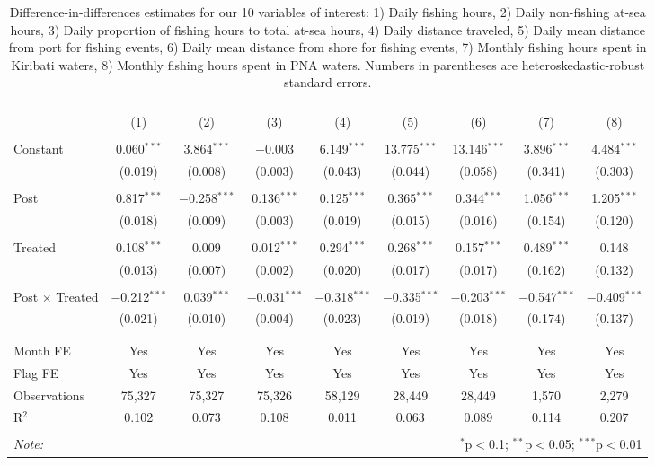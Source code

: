 
\begin{table}[!htbp] \centering 
  \caption{\label{tab:DID_without_CHN}Difference-in-differences estimates for our 10 variables of interest: 1) Daily fishing hours, 2) Daily non-fishing at-sea hours, 3) Daily proportion of fishing hours to total at-sea hours, 4) Daily distance traveled, 5) Daily mean distance from port for fishing events, 6) Daily mean distance from shore for fishing events, 7) Monthly fishing hours spent in Kiribati waters, 8) Monthly fishing hours spent in PNA waters. Numbers in parentheses are heteroskedastic-robust standard errors.} 
  \label{} 
\footnotesize 
\begin{tabular}{@{\extracolsep{1pt}}lcccccccc} 
\\[-1.8ex]\hline 
\hline \\[-1.8ex] 
\\[-1.8ex] & (1) & (2) & (3) & (4) & (5) & (6) & (7) & (8)\\ 
\hline \\[-1.8ex] 
 Constant & 0.060$^{***}$ & 3.864$^{***}$ & $-$0.003 & 6.149$^{***}$ & 13.775$^{***}$ & 13.146$^{***}$ & 3.896$^{***}$ & 4.484$^{***}$ \\ 
  & (0.019) & (0.008) & (0.003) & (0.043) & (0.044) & (0.058) & (0.341) & (0.303) \\ 
  & & & & & & & & \\ 
 Post & 0.817$^{***}$ & $-$0.258$^{***}$ & 0.136$^{***}$ & 0.125$^{***}$ & 0.365$^{***}$ & 0.344$^{***}$ & 1.056$^{***}$ & 1.205$^{***}$ \\ 
  & (0.018) & (0.009) & (0.003) & (0.019) & (0.015) & (0.016) & (0.154) & (0.120) \\ 
  & & & & & & & & \\ 
 Treated & 0.108$^{***}$ & 0.009 & 0.012$^{***}$ & 0.294$^{***}$ & 0.268$^{***}$ & 0.157$^{***}$ & 0.489$^{***}$ & 0.148 \\ 
  & (0.013) & (0.007) & (0.002) & (0.020) & (0.017) & (0.017) & (0.162) & (0.132) \\ 
  & & & & & & & & \\ 
 Post $\times$ Treated & $-$0.212$^{***}$ & 0.039$^{***}$ & $-$0.031$^{***}$ & $-$0.318$^{***}$ & $-$0.335$^{***}$ & $-$0.203$^{***}$ & $-$0.547$^{***}$ & $-$0.409$^{***}$ \\ 
  & (0.021) & (0.010) & (0.004) & (0.023) & (0.019) & (0.018) & (0.174) & (0.137) \\ 
  & & & & & & & & \\ 
\hline \\[-1.8ex] 
Month FE & Yes & Yes & Yes & Yes & Yes & Yes & Yes & Yes \\ 
Flag FE & Yes & Yes & Yes & Yes & Yes & Yes & Yes & Yes \\ 
Observations & 75,327 & 75,327 & 75,326 & 58,129 & 28,449 & 28,449 & 1,570 & 2,279 \\ 
R$^{2}$ & 0.102 & 0.073 & 0.108 & 0.011 & 0.063 & 0.089 & 0.114 & 0.207 \\ 
\hline 
\hline \\[-1.8ex] 
\textit{Note:}  & \multicolumn{8}{r}{$^{*}$p$<$0.1; $^{**}$p$<$0.05; $^{***}$p$<$0.01} \\ 
\end{tabular} 
\end{table} 
